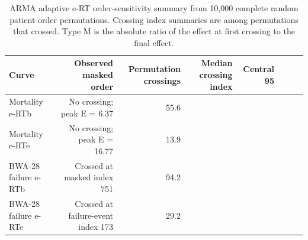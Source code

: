 \begin{table}[htbp]
\centering
\caption{ARMA adaptive e-RT order-sensitivity summary from 10,000 complete random patient-order permutations. Crossing index summaries are among permutations that crossed. Type M is the absolute ratio of the effect at first crossing to the final effect.}
\begin{tabular}{lrrrrrrr}
\hline
Curve & Observed masked order & Permutation crossings & Median crossing index & Central 95%
\\ \hline
Mortality e-RTb & No crossing; peak E = 6.37 & 55.6\\%
Mortality e-RTe & No crossing; peak E = 16.77 & 13.9\\%
BWA-28 failure e-RTb & Crossed at masked index 751 & 94.2\\%
BWA-28 failure e-RTe & Crossed at failure-event index 173 & 29.2\\%
\hline
\end{tabular}
\end{table}
